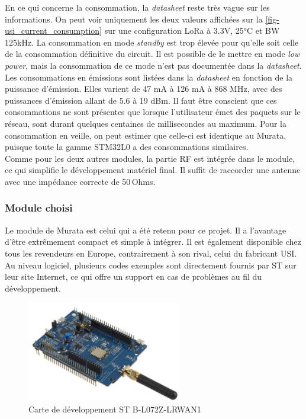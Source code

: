 En ce qui concerne la consommation, la \textit{datasheet} reste très vague sur les informations. On peut voir uniquement les deux valeurs affichées sur la \cref{fig-usi_current_consumption} sur une configuration LoRa à 3.3V, 25°C et BW 125kHz. La consommation en mode \textit{standby} est trop élevée pour qu'elle soit celle de la consommation définitive du circuit. Il est possible de le mettre en mode \textit{low power}, mais la consommation de ce mode n'est pas documentée dans la \textit{datasheet}. Les consommations en émissions sont listées dans la \textit{datasheet} en fonction de la puissance d'émission. Elles varient de 47 mA à 126 mA à 868 MHz, avec des puissances d'émission allant de 5.6 à 19 dBm. Il faut être conscient que ces consommations ne sont présentes que lorsque l'utilisateur émet des paquets sur le réseau, sont durant quelques centaines de millisecondes au maximum. Pour la consommation en veille, on peut estimer que celle-ci est identique au Murata, puisque toute la gamme STM32L0 a des consommations similaires.\\

Comme pour les deux autres modules, la partie RF est intégrée dans le module, ce qui simplifie le développement matériel final. Il suffit de raccorder une antenne avec une impédance correcte de 50\,Ohms.

\subsubsection{Module choisi}

Le module de Murata est celui qui a été retenu pour ce projet. Il a l'avantage d'être extrêmement compact et simple à intégrer. Il est également disponible chez tous les revendeurs en Europe, contrairement à son rival, celui du fabricant USI. Au niveau logiciel, plusieurs codes exemples sont directement fournis par ST sur leur site Internet, ce qui offre un support en cas de problèmes au fil du développement.\\

\begin{figure}[ht!]
    \centering
    \includegraphics[width=0.6\textwidth]{Figures/Hardware/B_L072Z_st_dev_board.jpg}
    \caption{Carte de développement ST B-L072Z-LRWAN1}
    \label{fig-B_L072Z_st_dev_board}
\end{figure}

